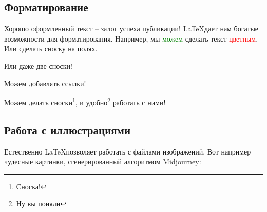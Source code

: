 \documentclass[a4paper,12pt]{article}
\begin{document}
\subsection{Форматирование}

Хорошо оформленный текст -- залог успеха публикации! \LaTeX дает
нам богатые возможности для форматирования. Например, мы \textcolor{green}{можем} сделать
текст \textcolor{red}{цветным}. Или сделать сноску на полях.

Или даже две сноски!


Можем добавлять \href{https://math.hse.ru}{ссылки}!

Можем делать сноски\footnote[1]{Сноска!}, и удобно\footnote[2]{Ну вы поняли} работать с ними\footnotemark[2]! 

\subsection{Работа с иллюстрациями}

Естественно \LaTeX позволяет работать с файлами изображений.
Вот например чудесные картинки, сгенерированный алгоритмом
Midjourney:
\end{document}
